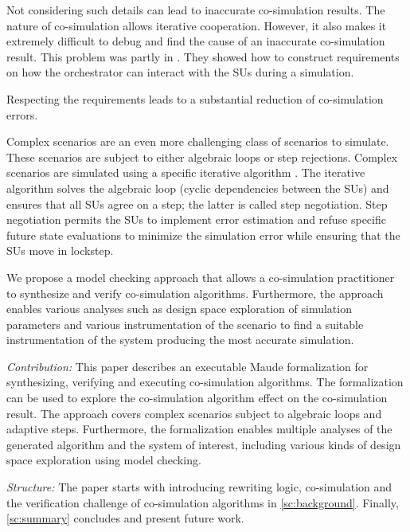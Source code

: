Not considering such details can lead to inaccurate co-simulation results.
The nature of co-simulation allows iterative cooperation. 
However, it also makes it extremely difficult to debug and find the cause of an inaccurate co-simulation result.
This problem was partly in \cite{Gomes2019,Oakes2021}.
They showed how to construct requirements on how the orchestrator can interact with the SUs during a simulation. 

Respecting the requirements leads to a substantial reduction of co-simulation errors. 

Complex scenarios are an even more challenging class of scenarios to simulate.
These scenarios are subject to either algebraic loops or step rejections. 
Complex scenarios are simulated using a specific iterative algorithm \cite{thrane2021}. 
The iterative algorithm solves the algebraic loop (cyclic dependencies between the SUs) and ensures that all SUs agree on a step; the latter is called step negotiation. 
Step negotiation permits the SUs to implement error estimation and refuse specific future state evaluations to minimize the simulation error while ensuring that the SUs move in lockstep.


We propose a model checking approach that allows a co-simulation practitioner to synthesize and verify co-simulation algorithms.
Furthermore, the approach enables various analyses such as design space exploration of simulation parameters and various instrumentation of the scenario to find a suitable instrumentation of the system producing the most accurate simulation.


\textit{Contribution:}
This paper describes an executable Maude formalization for synthesizing, verifying and executing co-simulation algorithms.
The formalization can be used to explore the co-simulation algorithm effect on the co-simulation result.
The approach covers complex scenarios subject to algebraic loops and adaptive steps.
Furthermore, the formalization enables multiple analyses of the generated algorithm and the system of interest, including various kinds of design space exploration using model checking. 

\textit{Structure:}
The paper starts with introducing rewriting logic, co-simulation and the verification challenge of co-simulation algorithms in \cref{sc:background}. 
Finally, \cref{sc:summary} concludes and present future work.
